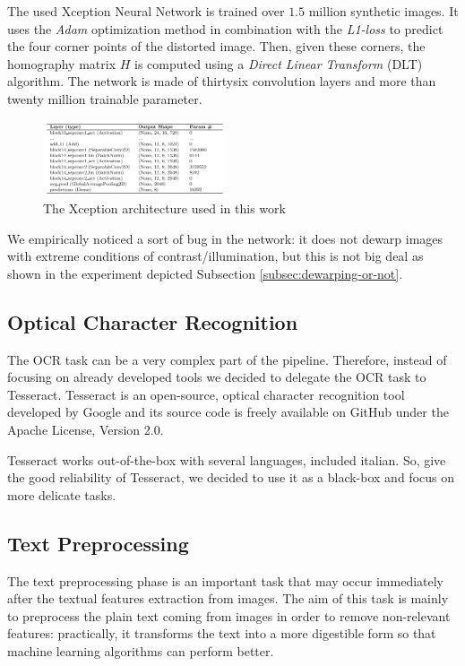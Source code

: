 \documentclass[10pt,twocolumn,letterpaper]{article}
\begin{document}
The used Xception Neural Network is trained over $1.5$ million
synthetic images. It uses the \emph{Adam} optimization method in
combination with the \emph{L1-loss} to predict the four corner points
of the distorted image. Then, given these corners, the homography
matrix $H$ is computed using a \emph{Direct Linear Transform} (DLT)
algorithm. The network is made of thirtysix convolution layers and
more than twenty million trainable parameter.

\begin{figure}[!ht]
  \centering
  \includegraphics[width=0.48\textwidth]{images/xception-architecture.png}
  \caption{The Xception architecture used in this work}
  \label{fig:xception-architecture}
\end{figure}

We empirically noticed a sort of bug in the network: it does not
dewarp images with extreme conditions of contrast/illumination, but
this is not big deal as shown in the experiment depicted Subsection
\ref{subsec:dewarping-or-not}.

\subsection{Optical Character Recognition}

The OCR task can be a very complex part of the pipeline. Therefore,
instead of focusing on already developed tools we decided to delegate
the OCR task to Tesseract. Tesseract is an open-source, optical
character recognition tool developed by Google and its source code is
freely available on GitHub under the Apache License, Version 2.0.

Tesseract works out-of-the-box with several languages, included
italian. So, give the good reliability of Tesseract, we decided to use
it as a black-box and focus on more delicate tasks.

\subsection{Text Preprocessing}

The text preprocessing phase is an important task that may occur
immediately after the textual features extraction from images. The aim
of this task is mainly to preprocess the plain text coming from images
in order to remove non-relevant features: practically, it transforms
the text into a more digestible form so that machine learning
algorithms can perform better.
\end{document}
